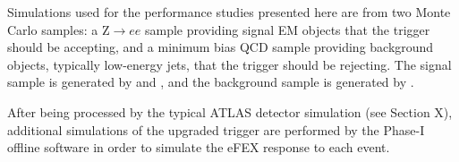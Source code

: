 
Simulations used for the performance studies presented here are from two Monte
Carlo samples: a Z$\to ee$ sample providing signal EM objects that the trigger
should be accepting, and a minimum bias QCD sample providing background objects,
typically low-energy jets, that the trigger should be rejecting. The signal
sample is generated by 
\powheg \cite{powheg}
and \pythia \cite{pythia8dot1},
and the background sample is generated by \pythia.

After being processed by the typical ATLAS detector simulation (see Section
X), %
additional simulations of the upgraded trigger are performed by the Phase-I
offline software in order to simulate the \ac{eFEX} response to each event.
